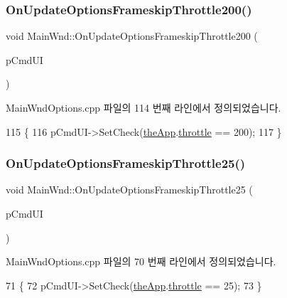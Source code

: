 \subsubsection{\texorpdfstring{On\+Update\+Options\+Frameskip\+Throttle200()}{OnUpdateOptionsFrameskipThrottle200()}}
{\footnotesize\ttfamily void Main\+Wnd\+::\+On\+Update\+Options\+Frameskip\+Throttle200 (\begin{DoxyParamCaption}\item[{C\+Cmd\+UI $\ast$}]{p\+Cmd\+UI }\end{DoxyParamCaption})\hspace{0.3cm}{\ttfamily [protected]}}



Main\+Wnd\+Options.\+cpp 파일의 114 번째 라인에서 정의되었습니다.


\begin{DoxyCode}
115 \{
116   pCmdUI->SetCheck(\mbox{\hyperlink{_v_b_a_8cpp_a8095a9d06b37a7efe3723f3218ad8fb3}{theApp}}.\mbox{\hyperlink{class_v_b_a_af21b98509a2589b38e4787f065b40a2b}{throttle}} == 200);
117 \}
\end{DoxyCode}
\mbox{\label{class_main_wnd_ac92a00f1057a61ae756c93004fb42938}} 
\subsubsection{\texorpdfstring{On\+Update\+Options\+Frameskip\+Throttle25()}{OnUpdateOptionsFrameskipThrottle25()}}
{\footnotesize\ttfamily void Main\+Wnd\+::\+On\+Update\+Options\+Frameskip\+Throttle25 (\begin{DoxyParamCaption}\item[{C\+Cmd\+UI $\ast$}]{p\+Cmd\+UI }\end{DoxyParamCaption})\hspace{0.3cm}{\ttfamily [protected]}}



Main\+Wnd\+Options.\+cpp 파일의 70 번째 라인에서 정의되었습니다.


\begin{DoxyCode}
71 \{
72   pCmdUI->SetCheck(\mbox{\hyperlink{_v_b_a_8cpp_a8095a9d06b37a7efe3723f3218ad8fb3}{theApp}}.\mbox{\hyperlink{class_v_b_a_af21b98509a2589b38e4787f065b40a2b}{throttle}} == 25);
73 \}
\end{DoxyCode}
\mbox{\label{class_main_wnd_a1a3e6740086e386c8953eed9c59d005d}} 
